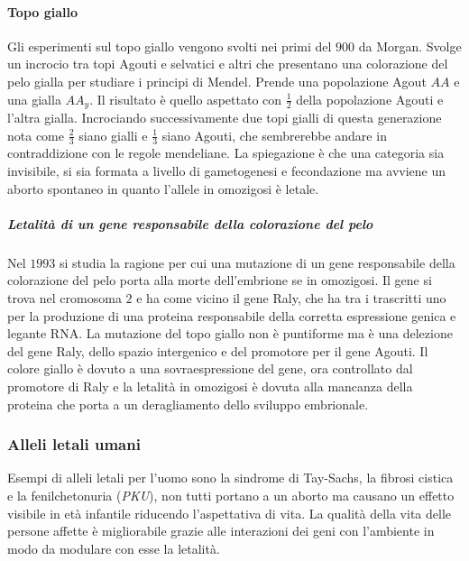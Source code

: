 \paragraph{Topo giallo}
Gli esperimenti sul topo giallo vengono svolti nei primi del $900$ da Morgan. Svolge un incrocio tra topi Agouti e selvatici e altri che presentano una colorazione del pelo gialla per
studiare i principi di Mendel. Prende una popolazione Agout $AA$ e una gialla $AA_y$. Il risultato \`e quello aspettato con $\frac{1}{2}$ della popolazione Agouti e l'altra gialla. 
Incrociando successivamente due topi gialli di questa generazione nota come $\frac{2}{3}$ siano gialli e $\frac{1}{3}$ siano Agouti, che sembrerebbe andare in contraddizione con le
regole mendeliane. La spiegazione \`e che una categoria sia invisibile, si sia formata a livello di gametogenesi e fecondazione ma avviene un aborto spontaneo in quanto l'allele in 
omozigosi \`e letale.
\subparagraph{Letalit\`a di un gene responsabile della colorazione del pelo}
Nel $1993$ si studia la ragione per cui una mutazione di un gene responsabile della colorazione del pelo porta alla morte dell'embrione se in omozigosi. Il gene si trova nel cromosoma
$2$ e ha come vicino il gene Raly, che ha tra i trascritti uno per la produzione di una proteina responsabile della corretta espressione genica e legante RNA. La mutazione del topo 
giallo non \`e puntiforme ma \`e una delezione del gene Raly, dello spazio intergenico e del promotore per il gene Agouti. Il colore giallo \`e dovuto a una sovraespressione del gene,
ora controllato dal promotore di Raly e la letalit\`a in omozigosi \`e dovuta alla mancanza della proteina che porta a un deragliamento dello sviluppo embrionale. 
\subsubsection{Alleli letali umani}
Esempi di alleli letali per l'uomo sono la sindrome di Tay-Sachs, la fibrosi cistica e la fenilchetonuria (\emph{PKU}), non tutti portano a un aborto ma causano un effetto visibile in
et\`a infantile riducendo l'aspettativa di vita. La qualit\`a della vita delle persone affette \`e migliorabile grazie alle interazioni dei geni con l'ambiente in modo da modulare
con esse la letalit\`a. 
